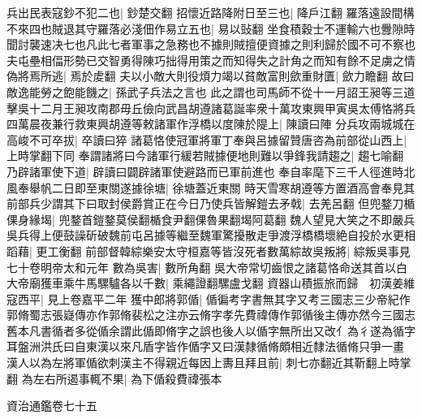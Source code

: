 兵出民表寇鈔不犯二也|{
	鈔楚交翻}
招懷近路降附日至三也|{
	降戶江翻}
羅落遠設間構不來四也賊退其守羅落必淺佃作易立五也|{
	易以䜴翻}
坐食積穀士不運輸六也釁隙時聞討襲速决七也凡此七者軍事之急務也不據則賊擅便資據之則利歸於國不可不察也夫屯壘相偪形勢已交智勇得陳巧拙得用策之而知得失之計角之而知有餘不足虜之情偽將焉所逃|{
	焉於䖍翻}
夫以小敵大則役煩力竭以貧敵富則歛重財匱|{
	歛力瞻翻}
故曰敵逸能勞之飽能饑之|{
	孫武子兵法之言也}
此之謂也司馬師不從十一月詔王昶等三道擊吳十二月王昶攻南郡毋丘儉向武昌胡遵諸葛誕率衆十萬攻東興甲寅吳太傅恪將兵四萬晨夜兼行救東興胡遵等敕諸軍作浮橋以度陳於隄上|{
	陳讀曰陣}
分兵攻兩城城在高峻不可卒拔|{
	卒讀曰猝}
諸葛恪使冠軍將軍丁奉與呂據留贊唐咨為前部從山西上|{
	上時掌翻下同}
奉謂諸將曰今諸軍行緩若賊據便地則難以爭鋒我請趨之|{
	趨七喻翻}
乃辟諸軍使下道|{
	辟讀曰闢辟諸軍使避路而已軍前進也}
奉自率麾下三千人徑進時北風奉舉帆二日即至東關遂據徐塘|{
	徐塘蓋近東關}
時天雪寒胡遵等方置酒高會奉見其前部兵少謂其下曰取封侯爵賞正在今日乃使兵皆解鎧去矛戟|{
	去羌呂翻}
但兜鍪刀楯倮身緣堨|{
	兜鍪首鎧鍪莫侯翻楯食尹翻倮魯果翻堨阿葛翻}
魏人望見大笑之不即嚴兵吳兵得上便鼓譟斫破魏前屯呂據等繼至魏軍驚擾散走爭渡浮橋橋壞絶自投於水更相蹈藉|{
	更工衡翻}
前部督韓綜樂安太守桓嘉等皆沒死者數萬綜故吳叛將|{
	綜叛吳事見七十卷明帝太和元年}
數為吳害|{
	數所角翻}
吳大帝常切齒恨之諸葛恪命送其首以白大帝廟獲車乘牛馬騾驢各以千數|{
	乘繩證翻騾盧戈翻}
資器山積振旅而歸　初漢姜維寇西平|{
	見上卷嘉平二年}
獲中郎將郭偱|{
	偱徧考字書無其字又考三國志三少帝紀作郭脩蜀志張嶷傳亦作郭脩裴松之注亦云脩字孝先費禕傳作郭循後主傳亦然今三國志舊本凡書循者多從偱余謂此偱即脩字之誤也後人以偱字無所出又改亻為彳遂為循字耳盤洲洪氏曰自東漢以來凡盾字皆作偱字又曰漢隸循脩頗相近隸法循脩只爭一畫}
漢人以為左將軍偱欲刺漢主不得親近每因上夀且拜且前|{
	刺七亦翻近其靳翻上時掌翻}
為左右所遏事輒不果|{
	為下偱殺費禕張本}


資治通鑑卷七十五
